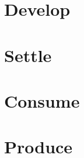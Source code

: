 \documentclass[letterpaper,landscape,twocolumn,8pt]{extarticle}
\begin{document}
\section{Develop}%
\section{Settle}%
\section{Consume}%
\section{Produce}%
\end{document}
